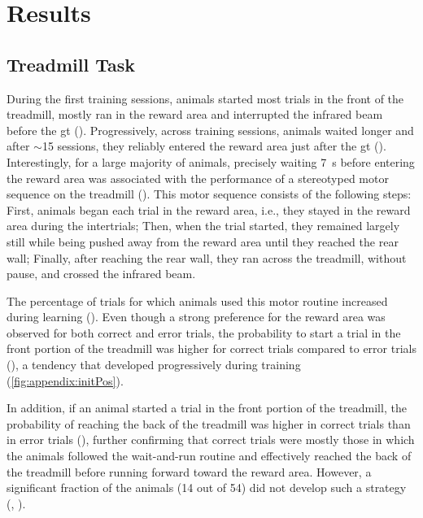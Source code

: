 \section{Results}
\label{ch:time:results}

\subsection{Treadmill Task}
\label{ch:time:treadmill}
During the first training sessions, animals started most trials in the front of the treadmill, mostly ran in the reward area and interrupted the infrared beam before the \gls{gt} ().
Progressively, across training sessions, animals waited longer and after $\sim$15 sessions, they reliably entered the reward area just after the \gls{gt} ().
Interestingly, for a large majority of animals, precisely waiting 7~s before entering the reward area was associated with the performance of a stereotyped motor sequence on the treadmill ().
This motor sequence consists of the following steps:
    First, animals began each trial in the reward area, i.e., they stayed in the reward area during the intertrials;
    Then, when the trial started, they remained largely still while being pushed away from the reward area until they reached the rear wall;
    Finally, after reaching the rear wall, they ran across the treadmill, without pause, and crossed the infrared beam.

The percentage of trials for which animals used this motor routine increased during learning ().
Even though a strong preference for the reward area was observed for both correct and error trials, the probability to start a trial in the front portion of the treadmill was higher for correct trials compared to error trials (), a tendency that developed progressively during training (\autoref{fig:appendix:initPos}).
\par
In addition, if an animal started a trial in the front portion of the treadmill, the probability of reaching the back of the treadmill was higher in correct trials than in error trials (), further confirming that correct trials were mostly those in which the animals followed the wait-and-run routine and effectively reached the back of the treadmill before running forward toward the reward area.
However, a significant fraction of the animals (14 out of 54) did not develop such a strategy (, ).
